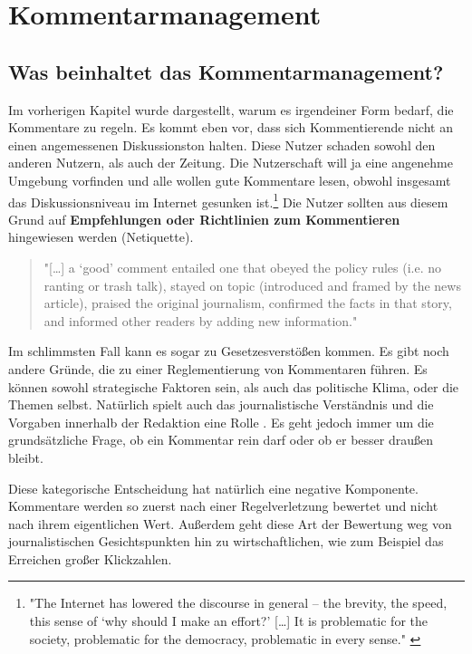 \chapter{Kommentarmanagement}

\section{Was beinhaltet das Kommentarmanagement?}
Im vorherigen Kapitel wurde dargestellt, warum es irgendeiner Form bedarf, die
Kommentare zu regeln. Es kommt eben vor, dass sich Kommentierende nicht an einen
angemessenen Diskussionston halten. Diese Nutzer schaden sowohl den anderen
Nutzern, als auch der Zeitung. Die Nutzerschaft will ja eine angenehme Umgebung
vorfinden \autocite[S.~217]{meyer-carey} und alle wollen \glqq gute\grqq{}
Kommentare lesen, obwohl insgesamt das Diskussionsniveau im Internet gesunken
ist.\footnote{"The Internet has lowered the discourse in general – the brevity,
the speed, this sense of ‘why should I make an effort?' [\ldots] It is
problematic for the society, problematic for the democracy, problematic in every
sense." \autocite[S.~130]{singer}} Die Nutzer sollten aus diesem Grund auf
{\bfseries Empfehlungen oder Richtlinien zum Kommentieren} hingewiesen werden
(\glqq Netiquette\grqq).


\begin{quote}
"[\ldots] a `good' comment entailed one that obeyed the policy rules (i.e. no
ranting or trash talk), stayed on topic (introduced and framed by the news
article), praised the original journalism, confirmed the facts in that story,
and informed other readers by adding new information."
\autocite[S.~134]{robinson}
\end{quote}

Im schlimmsten Fall kann es sogar zu Gesetzesverstößen kommen. Es gibt noch
andere Gründe, die zu einer Reglementierung von Kommentaren führen. Es können
sowohl strategische Faktoren sein, als auch das politische Klima, oder die
Themen selbst. Natürlich spielt auch das journalistische Verständnis und die
Vorgaben innerhalb der Redaktion eine Rolle \autocite[S.~106f]{reich}. Es geht
jedoch immer um die grundsätzliche Frage, ob ein Kommentar \glqq rein\grqq{}
darf oder ob er besser \glqq draußen\grqq{}  bleibt.

Diese kategorische Entscheidung hat natürlich eine negative Komponente.
Kommentare werden so zuerst nach einer Regelverletzung bewertet und nicht nach
ihrem eigentlichen Wert. Außerdem geht diese Art der Bewertung weg von
journalistischen Gesichtspunkten hin zu wirtschaftlichen, wie zum Beispiel das
Erreichen großer Klickzahlen.

